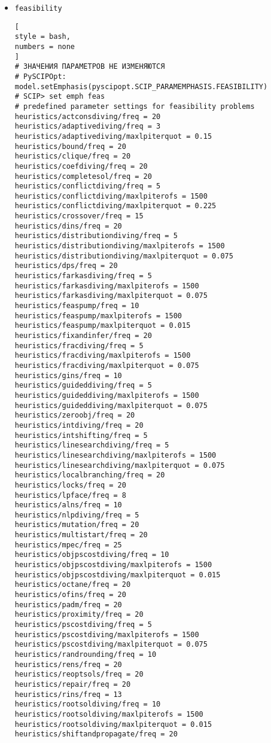 \documentclass[%
	11pt,
	a4paper,
	utf8,
		]{article}
\begin{document}
\begin{enumerate}
\begin{itemize}
    \item \verb|feasibility|
\begin{lstlisting}[
style = bash,
numbers = none
]
# ЗНАЧЕНИЯ ПАРАМЕТРОВ НЕ ИЗМЕНЯЮТСЯ
# PySCIPOpt: model.setEmphasis(pyscipopt.SCIP_PARAMEMPHASIS.FEASIBILITY)
# SCIP> set emph feas
# predefined parameter settings for feasibility problems
heuristics/actconsdiving/freq = 20
heuristics/adaptivediving/freq = 3
heuristics/adaptivediving/maxlpiterquot = 0.15
heuristics/bound/freq = 20
heuristics/clique/freq = 20
heuristics/coefdiving/freq = 20
heuristics/completesol/freq = 20
heuristics/conflictdiving/freq = 5
heuristics/conflictdiving/maxlpiterofs = 1500
heuristics/conflictdiving/maxlpiterquot = 0.225
heuristics/crossover/freq = 15
heuristics/dins/freq = 20
heuristics/distributiondiving/freq = 5
heuristics/distributiondiving/maxlpiterofs = 1500
heuristics/distributiondiving/maxlpiterquot = 0.075
heuristics/dps/freq = 20
heuristics/farkasdiving/freq = 5
heuristics/farkasdiving/maxlpiterofs = 1500
heuristics/farkasdiving/maxlpiterquot = 0.075
heuristics/feaspump/freq = 10
heuristics/feaspump/maxlpiterofs = 1500
heuristics/feaspump/maxlpiterquot = 0.015
heuristics/fixandinfer/freq = 20
heuristics/fracdiving/freq = 5
heuristics/fracdiving/maxlpiterofs = 1500
heuristics/fracdiving/maxlpiterquot = 0.075
heuristics/gins/freq = 10
heuristics/guideddiving/freq = 5
heuristics/guideddiving/maxlpiterofs = 1500
heuristics/guideddiving/maxlpiterquot = 0.075
heuristics/zeroobj/freq = 20
heuristics/intdiving/freq = 20
heuristics/intshifting/freq = 5
heuristics/linesearchdiving/freq = 5
heuristics/linesearchdiving/maxlpiterofs = 1500
heuristics/linesearchdiving/maxlpiterquot = 0.075
heuristics/localbranching/freq = 20
heuristics/locks/freq = 20
heuristics/lpface/freq = 8
heuristics/alns/freq = 10
heuristics/nlpdiving/freq = 5
heuristics/mutation/freq = 20
heuristics/multistart/freq = 20
heuristics/mpec/freq = 25
heuristics/objpscostdiving/freq = 10
heuristics/objpscostdiving/maxlpiterofs = 1500
heuristics/objpscostdiving/maxlpiterquot = 0.015
heuristics/octane/freq = 20
heuristics/ofins/freq = 20
heuristics/padm/freq = 20
heuristics/proximity/freq = 20
heuristics/pscostdiving/freq = 5
heuristics/pscostdiving/maxlpiterofs = 1500
heuristics/pscostdiving/maxlpiterquot = 0.075
heuristics/randrounding/freq = 10
heuristics/rens/freq = 20
heuristics/reoptsols/freq = 20
heuristics/repair/freq = 20
heuristics/rins/freq = 13
heuristics/rootsoldiving/freq = 10
heuristics/rootsoldiving/maxlpiterofs = 1500
heuristics/rootsoldiving/maxlpiterquot = 0.015
heuristics/shiftandpropagate/freq = 20

\end{lstlisting}
\end{itemize}
\end{enumerate}
\end{document}
